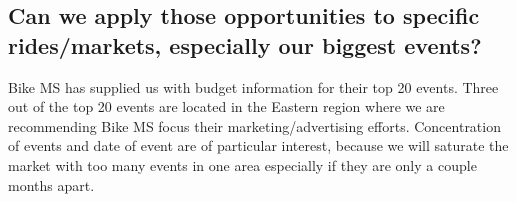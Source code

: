\documentclass[]{article}
\newenvironment{Shaded}{\begin{snugshade}}{\end{snugshade}}
\newcommand{\KeywordTok}[1]{\textcolor[rgb]{0.13,0.29,0.53}{\textbf{#1}}}
\newcommand{\DataTypeTok}[1]{\textcolor[rgb]{0.13,0.29,0.53}{#1}}
\newcommand{\DecValTok}[1]{\textcolor[rgb]{0.00,0.00,0.81}{#1}}
\newcommand{\StringTok}[1]{\textcolor[rgb]{0.31,0.60,0.02}{#1}}
\newcommand{\OperatorTok}[1]{\textcolor[rgb]{0.81,0.36,0.00}{\textbf{#1}}}
\newcommand{\NormalTok}[1]{#1}
\begin{document}
\begin{Shaded}
\end{Shaded}

\hypertarget{can-we-apply-those-opportunities-to-specific-ridesmarkets-especially-our-biggest-events}{%
\subsection{Can we apply those opportunities to specific rides/markets,
especially our biggest
events?}\label{can-we-apply-those-opportunities-to-specific-ridesmarkets-especially-our-biggest-events}}

Bike MS has supplied us with budget information for their top 20 events.
Three out of the top 20 events are located in the Eastern region where
we are recommending Bike MS focus their marketing/advertising efforts.
Concentration of events and date of event are of particular interest,
because we will saturate the market with too many events in one area
especially if they are only a couple months apart.
\end{document}
